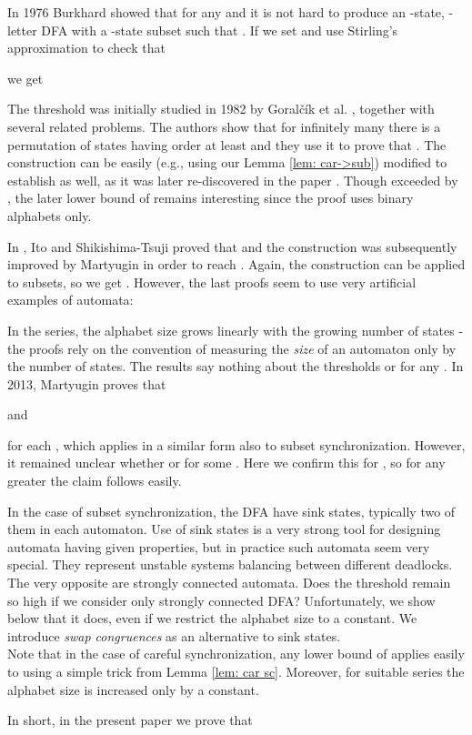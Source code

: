 \documentclass{ws-ijmpc}
\begin{document}
In 1976 Burkhard \citep{BUR1} showed that for any  and 
it is not hard to produce an -state, -letter
DFA with a -state subset  such that .
If we set  and use Stirling's approximation to check
that

we get

The threshold  was initially studied in 1982
by Goral\v{c}\'{i}k et al. \citep{GK1}, together with several related
problems. The authors show that for infinitely many  there is
a permutation of  states having order at least 
and they use it to prove that .
The construction can be easily (e.g., using our Lemma \ref{lem: car->sub})
modified to establish 
as well, as it was later re-discovered in the paper \citep{LY1}.
Though exceeded by ,
the later lower bound of  remains interesting
since the proof uses binary alphabets only.

In \citep{ITO1short}, Ito and Shikishima-Tsuji proved that 
and the construction was subsequently improved by Martyugin \citep{MAR6}
in order to reach . Again,
the construction can be applied to subsets, so we get .
However, the last proofs seem to use very artificial examples of automata:
\begin{itemlist}
\item In the series, the alphabet size grows linearly with the growing number
of states - the proofs rely on the convention of measuring the \emph{size
}of an automaton only by the number of states. The results say nothing
about the thresholds 
or  for any .
In 2013, Martyugin \citep{MAR5} proves that

and 

for each , which applies in a similar form also to subset
synchronization. However, it remained unclear whether 
or 
for some . Here we confirm this for , so for any greater
 the claim follows easily.
\item In the case of subset synchronization, the DFA have sink states, typically
two of them in each automaton. Use of sink states is a very strong
tool for designing automata having given properties, but in practice
such automata seem very special. They represent unstable systems balancing
between different deadlocks. The very opposite are strongly connected\emph{
}automata. Does the threshold remain so high if we consider only strongly
connected DFA? Unfortunately, we show below that it does, even if
we restrict the alphabet size to a constant. We introduce \emph{swap
congruences} as an alternative to sink states. \\
Note that in the case of careful synchronization, any lower bound
of  applies easily to 
using a simple trick from Lemma \ref{lem: car sc}. Moreover, for
suitable series the alphabet size is increased only by a constant.
\end{itemlist}
In short, in the present paper we prove that
\end{document}
